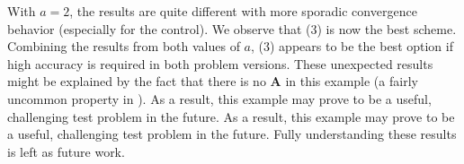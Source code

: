 With $a=2$, the results are quite different with more sporadic convergence behavior (especially for the control).
We observe that (3) is now the best scheme.
Combining the results from both values of $a$, (3) appears to be the best option if high accuracy is required in both problem versions.
These unexpected results might be explained by the fact that there is no $\bm{A}$ in this example (a fairly uncommon property in \lqdo). As a result, this example may prove to be a useful, challenging test problem in the future.
As a result, this example may prove to be a useful, challenging test problem in the future.
Fully understanding these results is left as future work.